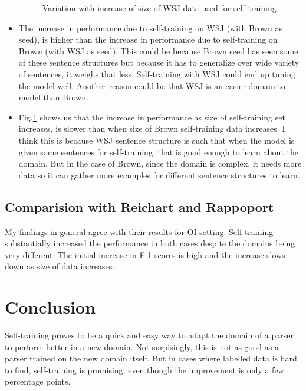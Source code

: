 \documentclass{article}
\begin{document}
\begin{itemize}
\begin{figure}[h]
    \caption{Variation with increase of size of WSJ data used for self-training}
   \label{fig:q6c}
\end{figure}
  \item The increase in performance due to self-training on WSJ (with Brown as seed), is higher than the increase in performance due to self-training on Brown (with WSJ as seed). This could be because Brown seed has seen some of these sentence structures but because it has to generalize over wide variety of sentences, it weighs that less. Self-training with WSJ could end up tuning the model well. Another reason could be that WSJ is an easier domain to model than Brown.
  \item Fig.\ref{fig:q6c} shows us that the increase in performance as size of self-training set increases, is slower than when size of Brown self-training data increases. I think this is because WSJ sentence structure is such that when the model is given some sentences for self-training, that is good enough to learn about the domain. But in the case of Brown, since the domain is complex, it needs more data so it can gather more examples for different sentence structures to learn.
\end{itemize}
\subsection{Comparision with Reichart and Rappoport}
My findings in general agree with their results for OI setting. Self-training substantially increased the performance in both cases despite the domains being very different. The initial increase in F-1 scores is high and the increase slows down as size of data increases.
\section{Conclusion}
Self-training proves to be a quick and easy way to adapt the domain of a parser to perform better in a new domain. Not surpisingly, this is not as good as a parser trained on the new domain itself. But in cases where labelled data is hard to find, self-training is promising, even though the improvement is only a few percentage points.
\end{document}
